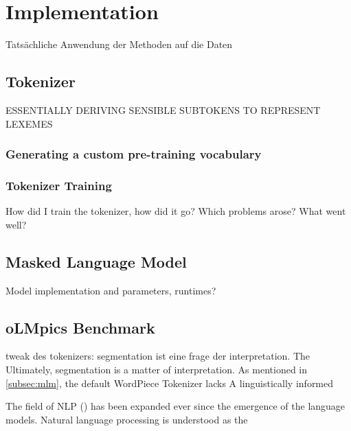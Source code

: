 \documentclass[english]{ttlab-qualify}
\begin{document}
    \section{Implementation}
    \label{sec:implementation}

    Tatsächliche Anwendung der Methoden auf die Daten

    \subsection{Tokenizer}
    \uppercase{essentially deriving sensible subtokens to represent lexemes}
    \label{subsec:tokenizer-training}

    \subsubsection{Generating a custom pre-training vocabulary}
    \label{subsubsec:generating-a-custom-pre-training-vocabulary}

    \subsubsection{Tokenizer Training}
    \label{subsubsec:tokenizer-training}
    How did I train the tokenizer, how did it go?
    Which problems arose? What went well?

    \subsection{Masked Language Model}
    \label{subsec:masked-language-model}
    Model implementation and parameters, runtimes?

    \subsection{oLMpics Benchmark}
    \label{subsec:olmpics-benchmark}



    tweak des tokenizers: segmentation ist eine frage der interpretation.
    The
    Ultimately, segmentation is a matter of interpretation.
    As mentioned in \ref{subsec:mlm}, the default WordPiece Tokenizer lacks
    A linguistically informed



    The field of NLP  (\cite{METZLER2016}) has been expanded ever since the emergence of the language models.
    Natural language processing is understood as the
    \\
\end{document}
